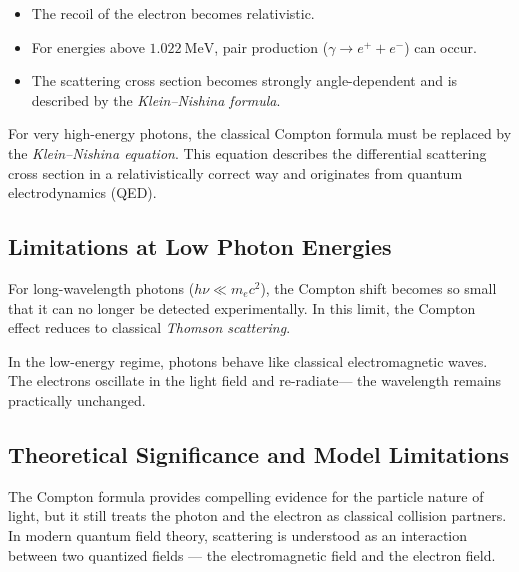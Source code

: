 \begin{itemize}
	\item The recoil of the electron becomes relativistic.
	\item For energies above \(1.022~\text{MeV}\), pair production (\(\gamma \to e^+ + e^-\)) can occur.
	\item The scattering cross section becomes strongly angle-dependent and is described by the \emph{Klein–Nishina formula}.
\end{itemize}

\begin{DidacticBox}
	For very high-energy photons, the classical Compton formula
	must be replaced by the \emph{Klein–Nishina equation}.
	This equation describes the differential scattering cross section
	in a relativistically correct way and originates from quantum electrodynamics (QED).
\end{DidacticBox}

\subsection{Limitations at Low Photon Energies}

For long-wavelength photons (\(h\nu \ll m_e c^2\)), the Compton shift becomes so small
that it can no longer be detected experimentally. In this limit,
the Compton effect reduces to classical \emph{Thomson scattering}.

\begin{NoteBox}
	In the low-energy regime, photons behave like classical electromagnetic waves.
	The electrons oscillate in the light field and re-radiate—
	the wavelength remains practically unchanged.
\end{NoteBox}

\subsection{Theoretical Significance and Model Limitations}

The Compton formula provides compelling evidence for the particle nature of light,
but it still treats the photon and the electron as classical collision partners.
In modern quantum field theory, scattering is understood as an interaction
between two quantized fields — the electromagnetic field
and the electron field.

